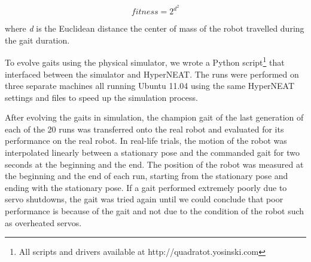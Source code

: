 \begin{equation}
fitness = 2^{d^{2}}
\end{equation}

where \emph{d} is the Euclidean distance the center of mass of the robot travelled during the gait duration. %



To evolve gaits using the physical simulator, we wrote a Python script\footnote{All scripts and drivers available at http://quadratot.yosinski.com} that interfaced between the simulator and HyperNEAT. %
The runs were performed on three separate machines all running Ubuntu 11.04 using the same HyperNEAT settings and files to speed up the simulation process.


After evolving the gaits in simulation, the champion gait of the last generation of each of the 20 runs was transferred onto the real robot and evaluated for its performance on the real robot.
In real-life trials, the motion of the robot was interpolated linearly between a stationary pose and the commanded gait for two seconds at the beginning and the end. 
The position of the robot was measured at the beginning and the end of each run, starting from the stationary pose and ending with the stationary pose. 
If a gait performed extremely poorly due to servo shutdowns, the gait was tried again until we could conclude that poor performance is because of the gait and not due to the condition of the robot such as overheated servos.

